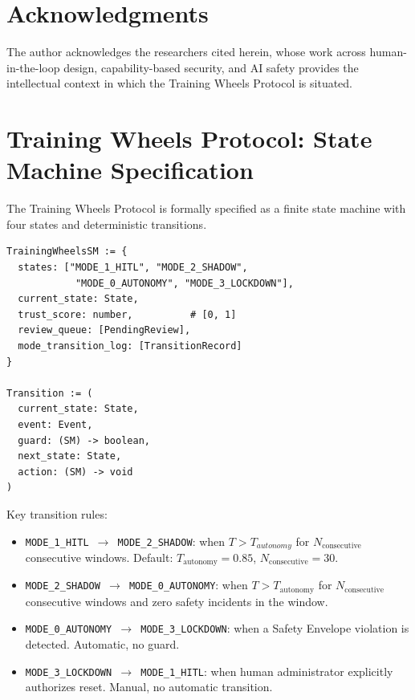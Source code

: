 \documentclass[12pt]{article}
\begin{document}
\section*{Acknowledgments}

The author acknowledges the researchers cited herein, whose work across human-in-the-loop design, capability-based security, and AI safety provides the intellectual context in which the Training Wheels Protocol is situated.


\section{Training Wheels Protocol: State Machine Specification}
\label{sec:twp-state-machine-spec}

The Training Wheels Protocol is formally specified as a finite state machine with four states and deterministic transitions.

\begin{verbatim}
TrainingWheelsSM := {
  states: ["MODE_1_HITL", "MODE_2_SHADOW",
            "MODE_0_AUTONOMY", "MODE_3_LOCKDOWN"],
  current_state: State,
  trust_score: number,          # [0, 1]
  review_queue: [PendingReview],
  mode_transition_log: [TransitionRecord]
}

Transition := (
  current_state: State,
  event: Event,
  guard: (SM) -> boolean,
  next_state: State,
  action: (SM) -> void
)
\end{verbatim}

Key transition rules:

\begin{itemize}
  \item \texttt{MODE\_1\_HITL $\to$ MODE\_2\_SHADOW}: when $T > T_{autonomy}$ for $N_{\text{consecutive}}$ consecutive windows. Default: $T_{\text{autonomy}} = 0.85$, $N_{\text{consecutive}} = 30$.
  \item \texttt{MODE\_2\_SHADOW $\to$ MODE\_0\_AUTONOMY}: when $T > T_{\text{autonomy}}$ for $N_{\text{consecutive}}$ consecutive windows and zero safety incidents in the window.
  \item \texttt{MODE\_0\_AUTONOMY $\to$ MODE\_3\_LOCKDOWN}: when a Safety Envelope violation is detected. Automatic, no guard.
  \item \texttt{MODE\_3\_LOCKDOWN $\to$ MODE\_1\_HITL}: when human administrator explicitly authorizes reset. Manual, no automatic transition.
\end{itemize}
\end{document}
